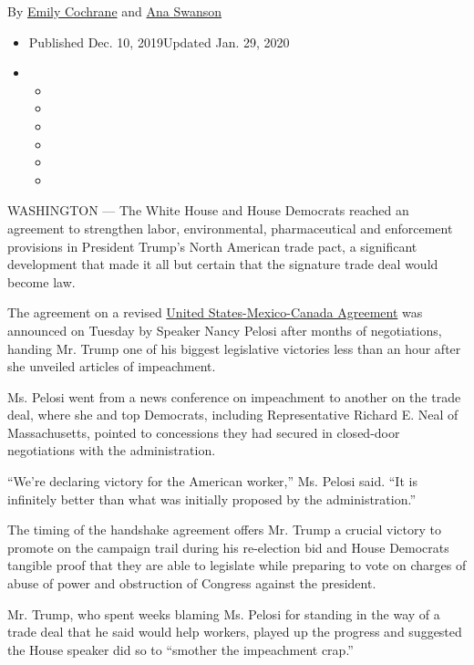 By \href{https://www.nytimes.com/by/emily-cochrane}{Emily Cochrane} and
\href{https://www.nytimes.com/by/ana-swanson}{Ana Swanson}

\begin{itemize}
\item
  Published Dec. 10, 2019Updated Jan. 29, 2020
\item
  \begin{itemize}
  \item
  \item
  \item
  \item
  \item
  \item
  \end{itemize}
\end{itemize}

WASHINGTON --- The White House and House Democrats reached an agreement
to strengthen labor, environmental, pharmaceutical and enforcement
provisions in President Trump's North American trade pact, a significant
development that made it all but certain that the signature trade deal
would become law.

The agreement on a revised
\href{https://www.nytimes.com/2020/01/29/business/economy/usmca-deal.html}{United
States-Mexico-Canada Agreement} was announced on Tuesday by Speaker
Nancy Pelosi after months of negotiations, handing Mr. Trump one of his
biggest legislative victories less than an hour after she unveiled
articles of impeachment.

Ms. Pelosi went from a news conference on impeachment to another on the
trade deal, where she and top Democrats, including Representative
Richard E. Neal of Massachusetts, pointed to concessions they had
secured in closed-door negotiations with the administration.

``We're declaring victory for the American worker,'' Ms. Pelosi said.
``It is infinitely better than what was initially proposed by the
administration.''

The timing of the handshake agreement offers Mr. Trump a crucial victory
to promote on the campaign trail during his re-election bid and House
Democrats tangible proof that they are able to legislate while preparing
to vote on charges of abuse of power and obstruction of Congress against
the president.

Mr. Trump, who spent weeks blaming Ms. Pelosi for standing in the way of
a trade deal that he said would help workers, played up the progress and
suggested the House speaker did so to ``smother the impeachment crap.''

